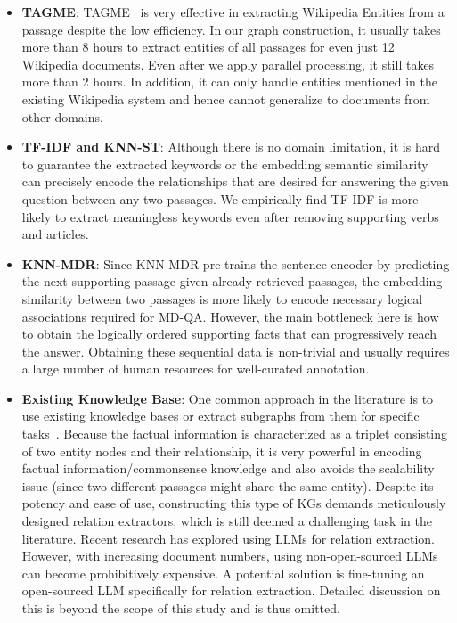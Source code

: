 \begin{itemize}
    \item \textbf{TAGME}: TAGME~\cite{ferragina2010tagme} is very effective in extracting Wikipedia Entities from a passage despite the low efficiency. In our graph construction, it usually takes more than 8 hours to extract entities of all passages for even just 12 Wikipedia documents. Even after we apply parallel processing, it still takes more than 2 hours. In addition, it can only handle entities mentioned in the existing Wikipedia system and hence cannot generalize to documents from other domains. 

    \item \textbf{TF-IDF and KNN-ST}: Although there is no domain limitation, it is hard to guarantee the extracted keywords or the embedding semantic similarity can precisely encode the relationships that are desired for answering the given question between any two passages. We empirically find TF-IDF is more likely to extract meaningless keywords even after removing supporting verbs and articles.

    \item \textbf{KNN-MDR}: Since KNN-MDR pre-trains the sentence encoder by predicting the next supporting passage given already-retrieved passages, the embedding similarity between two passages is more likely to encode necessary logical associations required for MD-QA. However, the main bottleneck here is how to obtain the logically ordered supporting facts that can progressively reach the answer. Obtaining these sequential data is non-trivial and usually requires a large number of human resources for well-curated annotation.

    \item \textbf{Existing Knowledge Base}: One common approach in the literature is to use existing knowledge bases or extract subgraphs from them for specific tasks~\cite{yasunaga2022deep, dong2023hierarchy, yasunaga2021qa}. Because the factual information is characterized as a triplet consisting of two entity nodes and their relationship, it is very powerful in encoding factual information/commonsense knowledge and also avoids the scalability issue (since two different passages might share the same entity). Despite its potency and ease of use, constructing this type of KGs demands meticulously designed relation extractors, which is still deemed a challenging task in the literature. Recent research has explored using LLMs for relation extraction. However, with increasing document numbers, using non-open-sourced LLMs can become prohibitively expensive. A potential solution is fine-tuning an open-sourced LLM specifically for relation extraction. Detailed discussion on this is beyond the scope of this study and is thus omitted.
\end{itemize}

